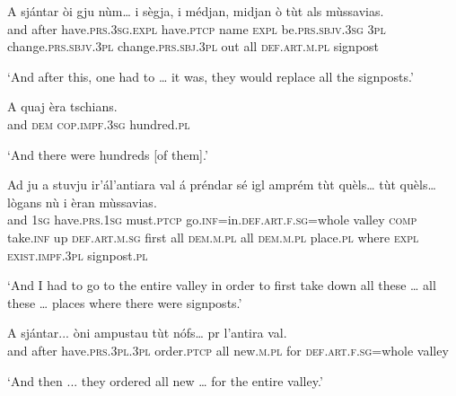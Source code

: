 \begin{linenumbers}
\gll A sjántar òi gju nùm… i sègja, i médjan, midjan ò tùt als mùssavias.   \\
and after have.\textsc{prs.3sg.expl} have.\textsc{ptcp} name \textsc{expl} be.\textsc{prs.sbjv.3sg}  \textsc{3pl} change.\textsc{prs.sbjv.3pl} change.\textsc{prs.sbj.3pl} out all \textsc{def.art.m.pl} signpost\\
\end{linenumbers}
\medskip
\glt `And after this, one had to … it was, they would replace all the signposts.'
\medskip

\begin{linenumbers}
\gll  A quaj èra tschians.   \\
and \textsc{dem} \textsc{cop.impf.3sg} hundred.\textsc{pl}\\
\end{linenumbers}
\medskip
\glt `And there were hundreds [of them].'
\medskip

\begin{linenumbers}
\gll Ad ju a stuvju ir’ál’antiara val á préndar sé igl amprém tùt quèls… tùt quèls… lògans nù i èran mùssavias.   \\
and \textsc{1sg} have.\textsc{prs.1sg} must.\textsc{ptcp} go.\textsc{inf=}in.\textsc{def.art.f.sg}=whole valley \textsc{comp} take.\textsc{inf} up \textsc{def.art.m.sg} first all \textsc{dem.m.pl} all \textsc{dem.m.pl} place.\textsc{pl} where \textsc{expl} \textsc{exist.impf.3pl} signpost.\textsc{pl}  \\
\end{linenumbers}
\medskip
\glt `And I had to go to the entire valley in order to first take down all these … all these … places where there were signposts.'
\medskip

\begin{linenumbers}
\gll  A sjántar... òni ampustau tùt nófs… pr l’antira val.  \\
and after have.\textsc{prs.3pl.3pl} order.\textsc{ptcp} all new.\textsc{m.pl} for \textsc{def.art.f.sg}=whole valley \\
\end{linenumbers}
\medskip
\glt `And then ... they ordered all new … for the entire valley.'
\medskip

